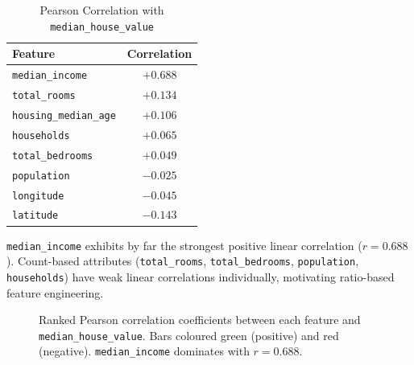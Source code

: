 \documentclass[conference]{IEEEtran}
\begin{document}
\begin{table}[H]
\centering
\caption{Pearson Correlation with \texttt{median\_house\_value}}
\label{tab:correlations}
\begin{tabular}{@{}lc@{}}
\toprule
\textbf{Feature} & \textbf{Correlation} \\
\midrule
\texttt{median\_income}      &  $+0.688$ \\
\texttt{total\_rooms}        &  $+0.134$ \\
\texttt{housing\_median\_age}&  $+0.106$ \\
\texttt{households}          &  $+0.065$ \\
\texttt{total\_bedrooms}     &  $+0.049$ \\
\texttt{population}          &  $-0.025$ \\
\texttt{longitude}           &  $-0.045$ \\
\texttt{latitude}            &  $-0.143$ \\
\bottomrule
\end{tabular}
\end{table}

\texttt{median\_income} exhibits by far the strongest positive linear correlation ($r = 0.688$). Count-based attributes (\texttt{total\_rooms}, \texttt{total\_bedrooms}, \texttt{population}, \texttt{households}) have weak linear correlations individually, motivating ratio-based feature engineering.

\begin{figure}[H]
    \centering
    \caption{Ranked Pearson correlation coefficients between each feature and \texttt{median\_house\_value}. Bars coloured green (positive) and red (negative). \texttt{median\_income} dominates with $r = 0.688$.}
    \label{fig:corr}
\end{figure}
\end{document}
